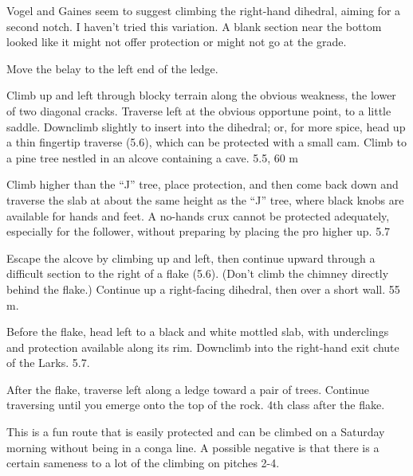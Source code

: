 \documentclass{tahquitz}
\begin{document}
 Vogel and Gaines seem to suggest climbing the right-hand dihedral,
aiming for a second notch. I haven't tried this variation.
A blank section near the bottom looked like it might not
offer protection or might not go at the grade.

 Move the belay to the left end of the ledge.


 Climb up and left through blocky terrain along the obvious weakness, the
lower of two diagonal cracks. Traverse left at the obvious opportune point, to a
little saddle. Downclimb slightly to insert into the dihedral; or, for more spice,
head up a thin fingertip traverse (5.6),
which can be protected with a small cam.
Climb to a pine tree nestled in an alcove containing a cave. 5.5, 60 m

 Climb higher than the ``J'' tree, place protection, and then come
back down and traverse the slab at about the same height as the ``J'' tree, where black
knobs are available for hands and feet. A no-hands crux cannot be protected adequately,
especially for the follower, without preparing by placing the pro higher up. 5.7

 Escape the alcove by climbing up and left, then continue
upward through a difficult section to the right of a flake (5.6).
(Don't climb the chimney directly behind the flake.) Continue up a
right-facing dihedral, then over a short wall.
55 m. 

 Before the flake, head left to a black and white mottled slab, with underclings
and protection available along its rim. Downclimb into the right-hand exit chute of the Larks. 5.7.

 After the flake, traverse left along a ledge toward a pair of trees. Continue
traversing until you emerge onto the top of the rock. 4th class after the flake.

\somespace

\northgully




This is a fun route that is easily protected and
can be climbed on a Saturday morning without being in a conga line. A
possible negative is that there is a certain sameness to a lot of the
climbing on pitches 2-4.
\end{document}
